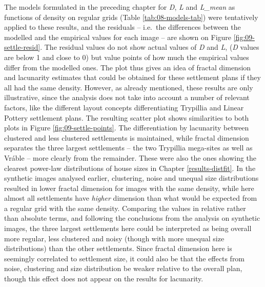 \documentclass[
  12pt,
  a4paper, twoside]{book}
\begin{document}
The models formulated in the preceding chapter for \emph{D}, \emph{L} and \emph{L\_mean} as functions of density on regular grids (Table \ref{tab:08-models-tab}) were tentatively applied to these results, and the residuals -- i.e.~the differences between the modelled and the empirical values for each image -- are shown on Figure \ref{fig:09-settle-resid}. The residual values do not show actual values of \emph{D} and \emph{L}, (\emph{D} values are below 1 and close to 0) but value points of how much the empirical values differ from the modelled ones. The plot thus gives an idea of fractal dimension and lacunarity estimates that could be obtained for these settlement plans if they all had the same density. However, as already mentioned, these results are only illustrative, since the analysis does not take into account a number of relevant factors, like the different layout concepts differentiating Trypillia and Linear Pottery settlement plans. The resulting scatter plot shows similarities to both plots in Figure \ref{fig:09-settle-points}. The differentiation by lacunarity between clustered and less clustered settlements is maintained, while fractal dimension separates the three largest settlements -- the two Trypillia mega-sites as well as Vráble -- more clearly from the remainder. These were also the ones showing the clearest power-law distributions of house sizes in Chapter \ref{results-distfit}. In the synthetic images analysed earlier, clustering, noise and unequal size distributions resulted in lower fractal dimension for images with the same density, while here almost all settlements have \emph{higher} dimension than what would be expected from a regular grid with the same density. Comparing the values in relative rather than absolute terms, and following the conclusions from the analysis on synthetic images, the three largest settlements here could be interpreted as being overall more regular, less clustered and noisy (though with more unequal size distributions) than the other settlements. Since fractal dimension here is seemingly correlated to settlement size, it could also be that the effects from noise, clustering and size distribution be weaker relative to the overall plan, though this effect does not appear on the results for lacunarity.
\end{document}
